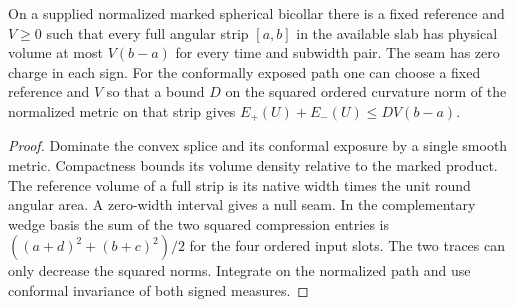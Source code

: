 \begin{proposition}
\label{prop:ed45-volume}
\leanok
On a supplied normalized marked spherical bicollar there is a fixed
reference and $V\ge0$ such that every full angular strip $[a,b]$ in the
available slab has physical volume at most $V(b-a)$ for every time and
subwidth pair. The seam has zero charge in each sign. For the conformally
exposed path one can choose a fixed reference and $V$ so that a bound $D$
on the squared ordered curvature norm of the normalized metric on that
strip gives $E_+(U)+E_-(U)\le DV(b-a)$.
\end{proposition}
\begin{proof}
\leanok
Dominate the convex splice and its conformal exposure by a single smooth
metric. Compactness bounds its volume density relative to the marked
product. The reference volume of a full strip is its native width times
the unit round angular area. A zero-width interval gives a null seam.
In the complementary wedge basis the sum of the two squared compression
entries is $((a+d)^2+(b+c)^2)/2$ for the four ordered input slots.
The two traces can only decrease the squared norms. Integrate on the
normalized path and use conformal invariance of both signed measures.
\end{proof}

